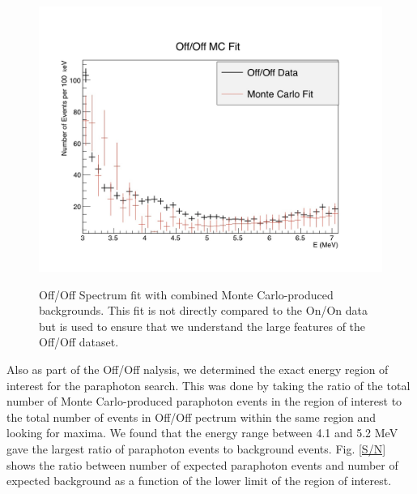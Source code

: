   \begin{figure}
\caption{ Off/Off Spectrum fit with combined Monte Carlo-produced backgrounds. This fit is not directly compared to the On/On data but is used to ensure that we understand the large features of the Off/Off dataset.}
\includegraphics[width=\textwidth]{Paraphotons/OffOffMCFit_edit.jpg}
\label{Off Off Fit}
\end{figure}

Also as part of the Off/Off nalysis, we determined the exact energy region of interest for the paraphoton search. This was done by taking the ratio of the total number of Monte Carlo-produced paraphoton events in the region of interest to the total number of events in Off/Off pectrum within the same region and looking for maxima. We found that the energy range between 4.1 and 5.2 MeV gave the largest ratio of paraphoton events to background events. Fig. \ref{S/N} shows the ratio between number of expected paraphoton events and number of expected background as a function of the lower limit of the region of interest. 

